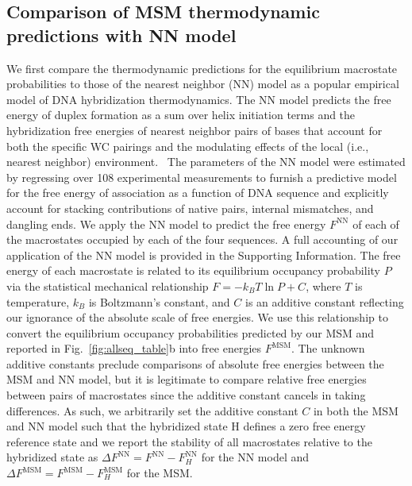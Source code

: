 \documentclass[journal=jpcbfk,manuscript=article]{achemso}
\newcommand*{\rood}[1]{{\color{red}{#1}}}
\newcommand*{\blauw}[1]{{#1}}
\begin{document}
\subsection{Comparison of MSM thermodynamic predictions with NN model} \label{sec:NN}

We first compare the thermodynamic predictions for the equilibrium macrostate probabilities \rood{made by the MSM models fitted at the sequence melting temperatures} to those of the nearest neighbor (NN) model as a popular empirical model of DNA hybridization thermodynamics. The NN model predicts the free energy of duplex formation as a sum over helix initiation terms and the hybridization free energies of nearest neighbor pairs of bases that account for both the specific WC pairings and the modulating effects of the local (i.e., nearest neighbor) environment.~\citep{SantaLucia1998AThermodynamics, Santalucia2004TheMotifs} The parameters of the NN model were estimated by regressing over 108 experimental measurements to furnish a predictive model for the free energy of association as a function of DNA sequence and explicitly account for stacking contributions of native pairs, internal mismatches, and dangling ends. We apply the NN model to predict the free energy $F^\mathrm{NN}$ of each of the macrostates occupied by each of the four sequences. A full accounting of our application of the NN model is provided in the \blauw{Supporting Information}. The free energy of each macrostate is related to its equilibrium occupancy probability $P$ via the statistical mechanical relationship $F = -k_B T \ln P + C$, where $T$ is temperature, $k_B$ is Boltzmann's constant, and $C$ is an additive constant reflecting our ignorance of the absolute scale of free energies. We use this relationship to convert the equilibrium occupancy probabilities predicted by our MSM and reported in Fig.~\ref{fig:allseq_table}b into free energies $F^\mathrm{MSM}$. The unknown additive constants preclude comparisons of absolute free energies between the MSM and NN model, but it is legitimate to compare relative free energies between pairs of macrostates since the additive constant cancels in taking differences. As such, we arbitrarily set the additive constant $C$ in both the MSM and NN model such that the hybridized state H defines a zero free energy reference state and we report the stability of all macrostates relative to the hybridized state as $\Delta F^\mathrm{NN} = F^\mathrm{NN} - F_H^\mathrm{NN}$ for the NN model and $\Delta F^\mathrm{MSM} = F^\mathrm{MSM} - F_H^\mathrm{MSM}$ for the MSM. 
\end{document}
